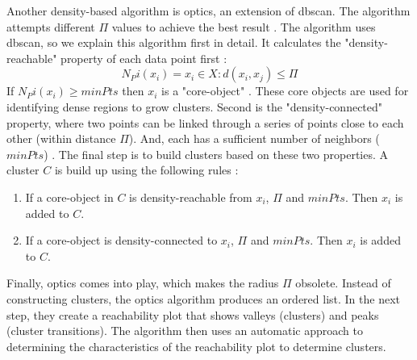 Another density-based algorithm is \gls{optics}, an extension of \gls{dbscan}.
The algorithm attempts different $\Pi$ values to achieve the best result \citep{ankerst_optics_nodate}.
The algorithm uses \gls{dbscan}, so we explain this algorithm first in detail.
It calculates the "density-reachable" property of each data point first \citep{ankerst_optics_nodate}:
\begin{equation}
    N_Pi(x_i) = {x_i \in X : d(x_i, x_j) \leq \Pi}
\end{equation}
If $N_Pi(x_i) \geq minPts$ then $x_i$ is a "core-object" \citep{ankerst_optics_nodate}.
These core objects are used for identifying dense regions to grow clusters.
Second is the "density-connected" property, where two points can be linked through a series of points close to each other (within distance $\Pi$).
And, each has a sufficient number of neighbors ($minPts$) \citep{ankerst_optics_nodate}.
The final step is to build clusters based on these two properties.
A cluster $C$ is build up using the following rules \citep{ankerst_optics_nodate}:
\begin{enumerate}
    \item If a core-object in $C$ is density-reachable from $x_i$, $\Pi$ and $minPts$. Then $x_i$ is added to $C$.
    \item If a core-object is density-connected to $x_i$, $\Pi$ and $minPts$. Then $x_i$ is added to $C$.
\end{enumerate}
Finally, \gls{optics} comes into play, which makes the radius $\Pi$ obsolete.
Instead of constructing clusters, the \gls{optics} algorithm produces an ordered list.
In the next step, they create a reachability plot that shows valleys (clusters) and peaks (cluster transitions).
The algorithm then uses an automatic approach to determining the characteristics of the reachability plot to determine clusters.

